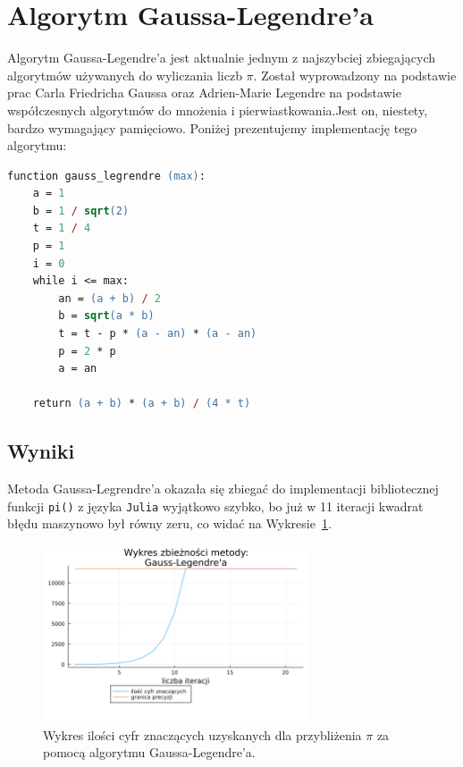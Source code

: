\section{Algorytm Gaussa-Legendre'a}

Algorytm Gaussa-Legendre'a jest aktualnie jednym z najszybciej zbiegających algorytmów używanych do wyliczania liczb $\pi$. Został wyprowadzony na podstawie prac Carla Friedricha Gaussa oraz Adrien-Marie Legendre na podstawie współczesnych algorytmów do mnożenia i pierwiastkowania.Jest on, niestety, bardzo wymagający pamięciowo. Poniżej prezentujemy implementację tego algorytmu\cite{gausse2}:

\newpage

\begin{lstlisting}[language=ps]
function gauss_legrendre (max):
    a = 1
    b = 1 / sqrt(2)
    t = 1 / 4
    p = 1
    i = 0
    while i <= max:
        an = (a + b) / 2
        b = sqrt(a * b)
        t = t - p * (a - an) * (a - an)
        p = 2 * p
        a = an
    
    return (a + b) * (a + b) / (4 * t)
\end{lstlisting}

\subsection{Wyniki}

Metoda Gaussa-Legrendre'a okazała się zbiegać do implementacji bibliotecznej funkcji \verb+pi()+ z języka \verb+Julia+ wyjątkowo szybko, bo już w 11 iteracji kwadrat błędu maszynowo był równy zeru, co widać na Wykresie~\ref{gauss-error}.

\begin{figure}[!h]
    \centering
    \renewcommand{\figurename}{Wykres}
    \includegraphics[width=0.7\textwidth]{../prog/gauss_legendre_log_error.png}
    \caption{Wykres ilości cyfr znaczących uzyskanych dla przybliżenia  $\pi$ za pomocą algorytmu Gaussa-Legendre'a.}
    \label{gauss-error}
\end{figure}

